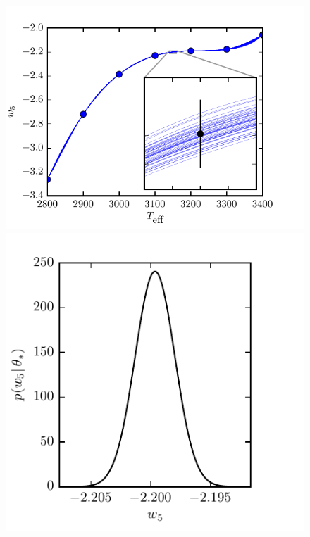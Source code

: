 \documentclass[iop,floatfix,numberedappendix,twocolappendix]{emulateapj}
\begin{document}
\begin{figure}[!t]
\begin{center}
  \includegraphics{figs/GP_left.pdf}
  \includegraphics{figs/GP_right.pdf}

\end{center}
\end{figure}
\end{document}
